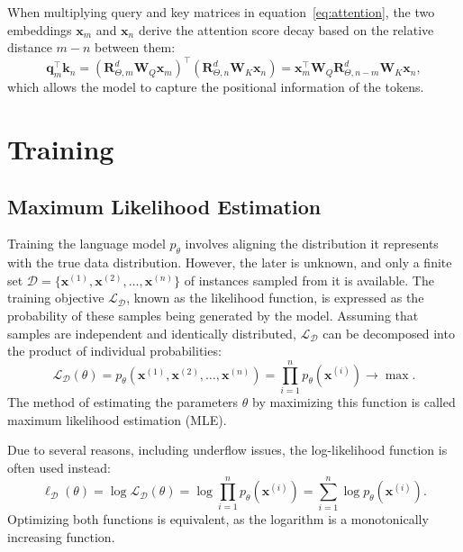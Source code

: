 When multiplying query and key matrices in equation~\ref{eq:attention}, the two embeddings \(\mathbf{x}_m\) and \(\mathbf{x}_n\) derive the attention score decay based on the relative distance \(m-n\) between them:
\begin{equation}
	\mathbf{q}_m^{\top}\mathbf{k}_n
	=(\mathbf{R}^d_{\Theta, m}\mathbf{W}_Q\mathbf{x}_m)^\top(\mathbf{R}^d_{\Theta, n}\mathbf{W}_K\mathbf{x}_n) =\mathbf{x}_m^\top\mathbf{W}_Q\mathbf{R}^d_{\Theta, n-m}\mathbf{W}_K\mathbf{x}_n,
\end{equation}
which allows the model to capture the positional information of the tokens.

\section{Training}


\subsection{Maximum Likelihood Estimation}

Training the language model \(p_\theta\) involves aligning the distribution it represents with the true data distribution. However, the later is unknown, and only a finite set \(\mathcal{D} = \{\bm{x}^{(1)}, \bm{x}^{(2)}, \ldots, \bm{x}^{(n)}\}\) of instances sampled from it is available. The training objective \(\mathcal{L}_{\mathcal{D}}\), known as the likelihood function, is expressed as the probability of these samples being generated by the model. Assuming that samples are independent and identically distributed, \(\mathcal{L}_{\mathcal{D}}\) can be decomposed into the product of individual probabilities:
\begin{equation}
	\mathcal{L}_{\mathcal{D}}(\theta) = p_{\theta}(\bm{x}^{(1)}, \bm{x}^{(2)}, \ldots, \bm{x}^{(n)}) = \prod_{i=1}^{n} p_{\theta}(\bm{x}^{(i)}) \rightarrow \max.
\end{equation}
The method of estimating the parameters \(\theta\) by maximizing this function is called maximum likelihood estimation (MLE).

Due to several reasons, including underflow issues, the log-likelihood function is often used instead:
\begin{equation}
	\ell_{\mathcal{D}}(\theta) = \log \mathcal{L}_{\mathcal{D}}(\theta) = \log \prod_{i=1}^{n} p_{\theta}(\bm{x}^{(i)}) = \sum_{i=1}^{n} \log p_{\theta}(\bm{x}^{(i)}).
\end{equation}
Optimizing both functions is equivalent, as the logarithm is a monotonically increasing function.

